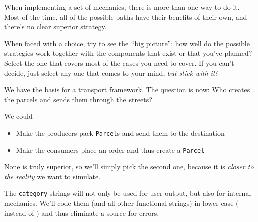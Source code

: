 \begin{frame}
%
\begin{hintbox}
When implementing a set of mechanics, there is more than one way to do it. Most of the time, all of the possible paths have their benefits of their own, and there's no clear superior strategy.

\vspace{6pt}
When faced with a choice, try to see the \enquote{big picture}: how well do the possible strategies work together with the components that exist or that you've planned? Select the one that covers most of the cases you need to cover. If you can't decide, just select any one that comes to your mind, \emph{but stick with it!}
\end{hintbox}
%
\end{frame}


\begin{frame}
%
\begin{tcolorbox}[title=Design Rule: Consumers place orders]
We have the basis for a transport framework. The question is now: Who creates the parcels and sends them through the streets?

We could
\begin{itemize}
\item Make the producers pack \texttt{Parcel}s and send them to the destination
\item Make the consumers place an order and thus create a \texttt{Parcel}
\end{itemize}

None is truly superior, so we'll simply pick the second one, because it is \emph{closer to the reality} we want to simulate.
\end{tcolorbox}
%
\begin{tcolorbox}[title=Design Rule: Lower Case Strings]
The \texttt{category} strings will not only be used for user output, but also for internal mechanics. We'll code them (and all other functional strings) in lower case (\ie {} instead of ) and thus eliminate a source for errors.
\end{tcolorbox}
%
\end{frame}


